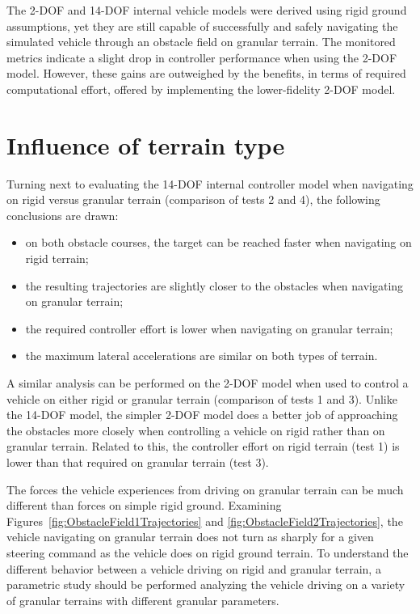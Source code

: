 \documentclass[12pt,onecolumn]{report}
\begin{document}
The 2-DOF and 14-DOF internal vehicle models were derived using rigid ground assumptions, yet they are still capable of successfully and safely navigating the simulated vehicle through an obstacle field on granular terrain. The monitored metrics indicate a slight drop in controller performance when using the 2-DOF model. However, these gains are outweighed by the benefits, in terms of required computational effort, offered by implementing the lower-fidelity 2-DOF model. 

\section{Influence of terrain type}

Turning next to evaluating the 14-DOF internal controller model when navigating on rigid versus granular terrain (comparison of tests 2 and 4), the following conclusions are drawn:
\begin{itemize}
\item on both obstacle courses, the target can be reached faster when navigating on rigid terrain;
\item the resulting trajectories are slightly closer to the obstacles when navigating on granular terrain;
\item the required controller effort is lower when navigating on granular terrain;
\item the maximum lateral accelerations are similar on both types of terrain.
\end{itemize}

A similar analysis can be performed on the 2-DOF model when used to control a vehicle on either rigid or granular terrain (comparison of tests 1 and 3). Unlike the 14-DOF model, the simpler 2-DOF model does a better job of approaching the obstacles more closely when controlling a vehicle on rigid rather than on granular terrain. Related to this, the controller effort on rigid terrain (test 1) is lower than that required on granular terrain (test 3). 

The forces the vehicle experiences from driving on granular terrain can be much different than forces on simple rigid ground. Examining Figures~\ref{fig:ObstacleField1Trajectories} and \ref{fig:ObstacleField2Trajectories}, the vehicle navigating on granular terrain does not turn as sharply for a given steering command as the vehicle does on rigid ground terrain. To understand the different behavior between a vehicle driving on rigid and granular terrain, a parametric study should be performed analyzing the vehicle driving on a variety of granular terrains with different granular parameters. 
\end{document}
